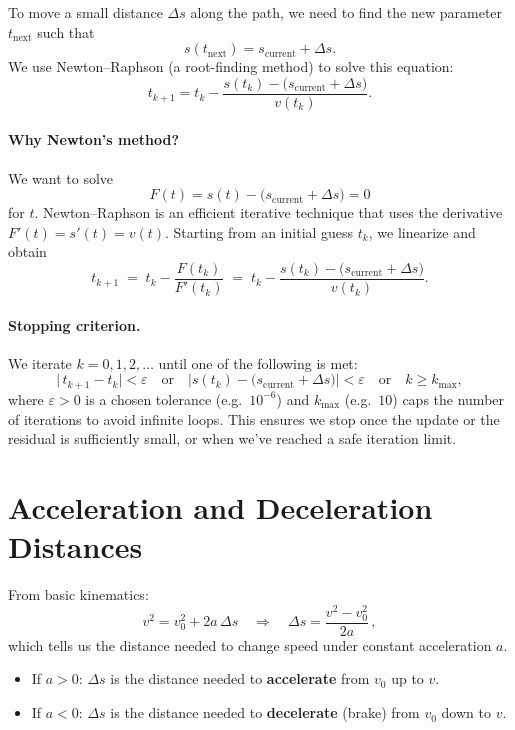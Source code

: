 \documentclass[11pt]{article}
\begin{document}
To move a small distance \(\Delta s\) along the path, we need to find the new parameter \(t_{\text{next}}\) such that 
\[
s(t_{\text{next}}) = s_{\text{current}} + \Delta s.
\]
We use Newton–Raphson (a root-finding method) to solve this equation:
\[
t_{k+1} = t_k - \frac{s(t_k) - \bigl(s_{\text{current}}+\Delta s\bigr)}{v(t_k)}.
\]

\paragraph{Why Newton's method?} We want to solve 
\[
F(t) = s(t) - \bigl(s_{\text{current}}+\Delta s\bigr) = 0
\]
for \(t\). Newton–Raphson is an efficient iterative technique that uses the derivative \(F'(t)=s'(t)=v(t)\).  Starting from an initial guess \(t_k\), we linearize and obtain
\[
t_{k+1} \;=\; t_k - \frac{F(t_k)}{F'(t_k)}
\;=\; t_k - \frac{s(t_k) - \bigl(s_{\text{current}}+\Delta s\bigr)}{v(t_k)}.
\]

\paragraph{Stopping criterion.} We iterate \(k=0,1,2,\dots\) until one of the following is met:
\[
\bigl|\,t_{k+1}-t_k\bigr| < \varepsilon
\quad\text{or}\quad
\bigl|s(t_k) - \bigl(s_{\text{current}}+\Delta s\bigr)\bigr| < \varepsilon
\quad\text{or}\quad
k \ge k_{\max},
\]
where \(\varepsilon>0\) is a chosen tolerance (e.g.\ \(10^{-6}\)) and \(k_{\max}\) (e.g.\ \(10\)) caps the number of iterations to avoid infinite loops. This ensures we stop once the update or the residual is sufficiently small, or when we’ve reached a safe iteration limit.
\section{Acceleration and Deceleration Distances}

From basic kinematics:
\[
v^2 = v_0^2 + 2a\,\Delta s
\quad\Longrightarrow\quad
\Delta s = \frac{v^2 - v_0^2}{2a}\,,
\] 
which tells us the distance needed to change speed under constant acceleration $a$. 

\begin{itemize}
  \item If \(a > 0\): \(\Delta s\) is the distance needed to \textbf{accelerate} from \(v_0\) up to \(v\).
  \item If \(a < 0\): \(\Delta s\) is the distance needed to \textbf{decelerate} (brake) from \(v_0\) down to \(v\).
\end{itemize}
\end{document}
